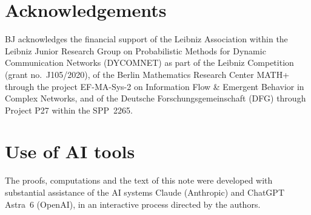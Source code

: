 \documentclass[11pt,letterpaper]{article}
\begin{document}
\section*{Acknowledgements}

BJ acknowledges the financial support of the Leibniz Association within the Leibniz Junior Research Group on Probabilistic Methods for Dynamic Communication Networks (DYCOMNET) as part of the Leibniz Competition (grant no.~J105/2020), of the Berlin Mathematics Research Center MATH+ through the project EF-MA-Sys-2 on Information Flow \& Emergent Behavior in Complex Networks, and of the Deutsche Forschungsgemeinschaft (DFG) through Project P27 within the SPP~2265.

\section*{Use of AI tools}

The proofs, computations and the text of this note were developed with substantial assistance of the AI systems Claude (Anthropic) and ChatGPT Astra~6 (OpenAI), in an interactive process directed by the authors.



\end{document}

